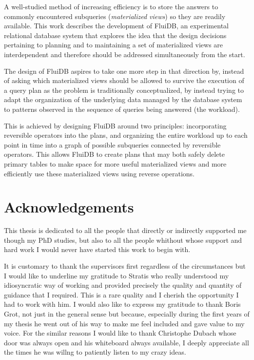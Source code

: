 \begin{precontent}
A well-studied method of increasing efficiency is to store the answers to commonly encountered subqueries (\emph{materialized views}) so they are readily available. This work describes the development of FluiDB, an experimental relational database system that explores the idea that the design decisions pertaining to planning and to maintaining a set of materialized views are interdependent and therefore should be addressed simultaneously from the start. 

The design of FluiDB aspires to take one more step in that direction by, instead  of asking which materialized views should be allowed to survive the execution of a query plan as the problem is traditionally conceptualized, by instead trying to adapt the organization of the underlying data managed by the database system to patterns observed in the sequence of queries being answered (the workload).

This is achieved by designing FluiDB around two principles: incorporating reversible operators into the plans, and organizing the entire workload up to each point in time into a graph of possible subqueries connected by reversible operators. This allows FluiDB to create plans that may both safely delete primary tables to make space for more useful materialized views and more efficiently use these materialized views using reverse operations.

\chapter{Acknowledgements}%

This thesis is dedicated to all the people that directly or indirectly
supported me though my PhD studies, but also to all the people
whithout whose support and hard work I would never have started this
work to begin with.

It is customary to thank the supervisors first regardless of the
circumstances but I would like to underline my gratitude to Stratis
who really understood my idiosyncratic way of working and provided
precisely the quality and quantity of guidance that I required. This
is a rare quality and I cherish the opportunity I had to work with
him. I would also like to express my gratitude to thank Boris Grot,
not just in the general sense but because, especially during the first
years of my thesis he went out of his way to make me feel included and
gave value to my voice. For the similar reasons I would like to thank
Christophe Dubach whose door was always open and his whiteboard always
available, I deeply appreciate all the times he was willng to
patiently listen to my crazy ideas.


\end{precontent}
